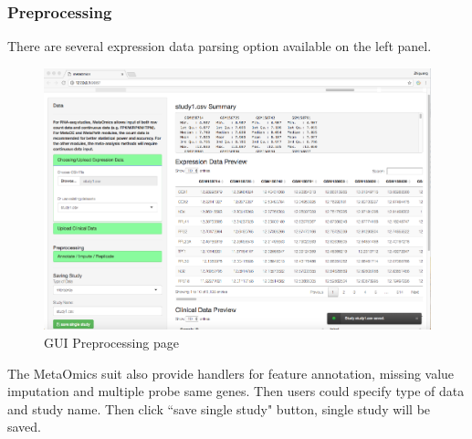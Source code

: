 \subsubsection{Preprocessing}
There are several expression data parsing option available on the left panel.
\begin{figure}[H]
\begin{center}
\includegraphics[scale=0.35]{./figure/preprocessing/GUIpreview}
\caption{GUI Preprocessing page}
\label{fig:GUIpreview}
\end{center}
\end{figure}
The MetaOmics suit also provide handlers for feature annotation, missing value imputation and multiple probe same genes.
Then users could specify type of data and study name.
Then click ``save single study" button, single study will be saved.


